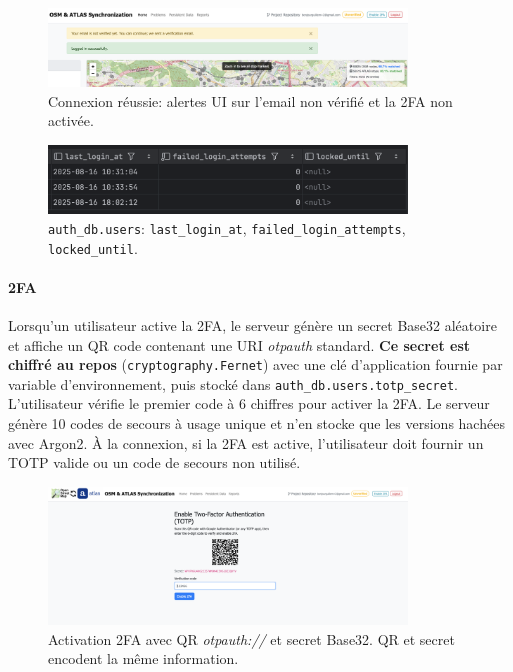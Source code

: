 \begin{itemize}
\begin{figure}[H]
  \centering
  \includegraphics[width=0.85\textwidth]{../figures/chap10/login_succesful.png}
  \caption{Connexion réussie: alertes UI sur l'email non vérifié et la 2FA non activée.}
\end{figure}

\begin{figure}[H]
  \centering
  \includegraphics[width=0.85\textwidth]{../figures/chap10/auth_db4.png}
  \caption{\texttt{auth\_db.users}: \texttt{last\_login\_at}, \texttt{failed\_login\_attempts}, \texttt{locked\_until}.}
\end{figure}

\paragraph{2FA}
Lorsqu'un utilisateur active la 2FA, le serveur génère un secret Base32 aléatoire et affiche un QR code contenant une URI \textit{otpauth} standard. \textbf{Ce secret est chiffré au repos} (\texttt{cryptography.Fernet}) avec une clé d'application fournie par variable d'environnement, puis stocké dans \texttt{auth\_db.users.totp\_secret}. L'utilisateur vérifie le premier code à 6 chiffres pour activer la 2FA. Le serveur génère 10 codes de secours à usage unique et n'en stocke que les versions hachées avec Argon2. À la connexion, si la 2FA est active, l'utilisateur doit fournir un TOTP valide ou un code de secours non utilisé.

\begin{figure}[H]
  \centering
  \includegraphics[width=0.85\textwidth]{../figures/chap10/enable_up2fa.png}
  \caption{Activation 2FA avec QR \textit{otpauth://} et secret Base32. QR et secret encodent la même information.}
\end{figure}


\end{itemize}
